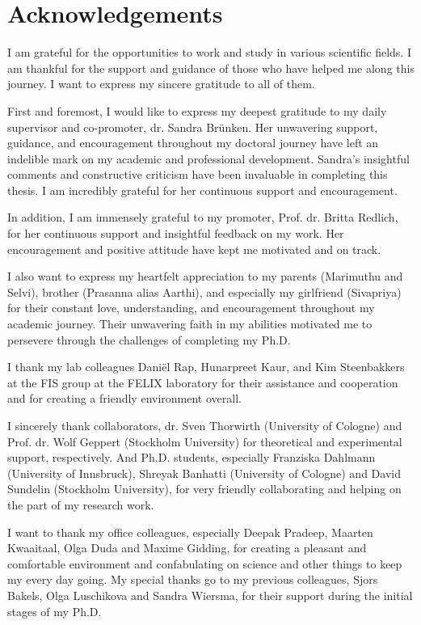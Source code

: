 \chapter{Acknowledgements}
\label{acknowledgements}

I am grateful for the opportunities to work and study in various scientific fields. I am thankful for the support and guidance of those who have helped me along this journey. I want to express my sincere gratitude to all of them.

First and foremost, I would like to express my deepest gratitude to my daily supervisor and co-promoter, dr. Sandra Br\"{u}nken. Her unwavering support, guidance, and encouragement throughout my doctoral journey have left an indelible mark on my academic and professional development. 
Sandra's insightful comments and constructive criticism have been invaluable in completing this thesis. I am incredibly grateful for her continuous support and encouragement.

In addition, I am immensely grateful to my promoter, Prof. dr. Britta Redlich, for her continuous support and insightful feedback on my work. Her encouragement and positive attitude have kept me motivated and on track.

I also want to express my heartfelt appreciation to my parents (Marimuthu and Selvi), brother (Prasanna alias Aarthi), and especially my girlfriend (Sivapriya) for their constant love, understanding, and encouragement throughout my academic journey. Their unwavering faith in my abilities motivated me to persevere through the challenges of completing my Ph.D.

I thank my lab colleagues Dani\"{e}l Rap, Hunarpreet Kaur, and Kim Steenbakkers at the FIS group at the FELIX laboratory for their assistance and cooperation and for creating a friendly environment overall.

I sincerely thank collaborators, dr. Sven Thorwirth (University of Cologne) and Prof. dr. Wolf Geppert (Stockholm University) for theoretical and experimental support, respectively. And Ph.D. students, especially Franziska Dahlmann (University of Innsbruck), Shreyak Banhatti (University of Cologne) and David Sundelin (Stockholm University), for very friendly collaborating and helping on the part of my research work.

 I want to thank my office colleagues, especially Deepak Pradeep, Maarten Kwaaitaal, Olga Duda and Maxime Gidding, for creating a pleasant and comfortable environment and confabulating on science and other things to keep my every day going. My special thanks go to my previous colleagues, Sjors Bakels, Olga Luschikova and Sandra Wiersma, for their support during the initial stages of my Ph.D.

